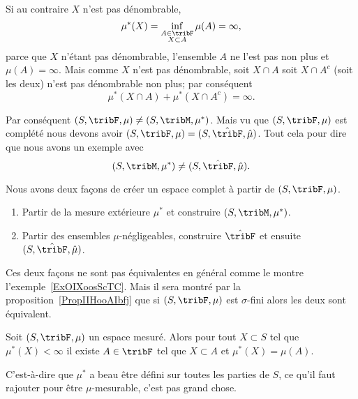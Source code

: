 \begin{example}
\begin{subproof}
        Si au contraire \( X\) n'est pas dénombrable,
        \begin{equation}
            \mu^*(X)=\inf_{\substack{A\in\tribF\\X\subset A}}\mu(A)=\infty,
        \end{equation}
         parce que \( X\) n'étant pas dénombrable, l'ensemble \( A\) ne l'est pas non plus et \( \mu(A)=\infty\). Mais comme \( X\) n'est pas dénombrable, soit \( X\cap A\) soit \( X\cap A^c\) (soit les deux) n'est pas dénombrable non plus; par conséquent
         \begin{equation}
             \mu^*(X\cap A)+\mu^*(X\cap A^c)=\infty.
         \end{equation}
    \end{subproof}

    Par conséquent \( (S,\tribF,\mu) \neq (S,\tribM,\mu^*)\). Mais vu que \( (S,\tribF,\mu)\) est complété nous devons avoir \( (S,\tribF,\mu)=(S,\hat\tribF,\hat\mu)\). Tout cela pour dire que nous avons un exemple avec
    \begin{equation}
        (S,\tribM,\mu^*)\neq (S,\hat\tribF,\hat \mu).
    \end{equation}
\end{example}

Nous avons deux façons de créer un espace complet à partir de \( (S,\tribF,\mu)\).
\begin{enumerate}
    \item
        Partir de la mesure extérieure \( \mu^*\) et construire \( (S,\tribM,\mu^*)\).
    \item
        Partir des ensembles \( \mu\)-négligeables, construire \( \hat\tribF\) et ensuite \( (S,\hat\tribF,\hat\mu)\).
\end{enumerate}
Ces deux façons ne sont pas équivalentes en général comme le montre l'exemple~\ref{ExOIXoosScTC}. Mais il sera montré par la proposition~\ref{PropIIHooAIbfj} que si \( (S,\tribF,\mu)\) est \( \sigma\)-fini alors les deux sont équivalent.

\begin{lemma}   \label{LemAESoofkMpi}
    Soit \( (S,\tribF,\mu)\) un espace mesuré. Alors pour tout \( X\subset S\) tel que \( \mu^*(X)<\infty\) il existe \( A\in\tribF\) tel que \( X\subset A\) et \( \mu^*(X)=\mu(A)\).
\end{lemma}
C'est-à-dire que \( \mu^*\) a beau être défini sur toutes les parties de \( S\), ce qu'il faut rajouter pour être \( \mu\)-mesurable, c'est pas grand chose.

